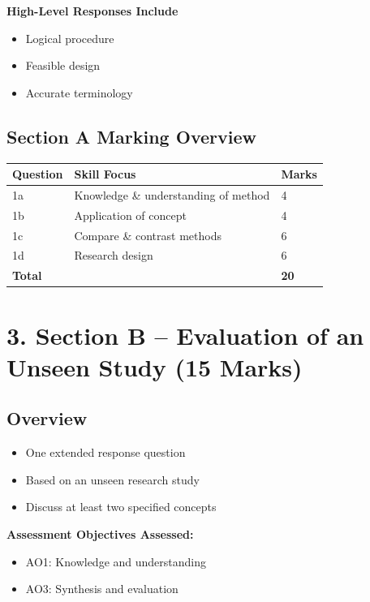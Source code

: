 \documentclass[12pt,a4paper]{article}
\begin{document}
\textbf{High-Level Responses Include}
\begin{itemize}
    \item Logical procedure
    \item Feasible design
    \item Accurate terminology
\end{itemize}

\subsection*{Section A Marking Overview}

\begin{center}
\begin{tabular}{lll}
\toprule
\textbf{Question} & \textbf{Skill Focus} & \textbf{Marks} \\
\midrule
1a & Knowledge \& understanding of method & 4 \\
1b & Application of concept & 4 \\
1c & Compare \& contrast methods & 6 \\
1d & Research design & 6 \\
\midrule
\textbf{Total} & & \textbf{20} \\
\bottomrule
\end{tabular}
\end{center}

\section*{3. Section B – Evaluation of an Unseen Study (15 Marks)}

\subsection*{Overview}

\begin{itemize}
    \item One extended response question
    \item Based on an unseen research study
    \item Discuss at least two specified concepts
\end{itemize}

\textbf{Assessment Objectives Assessed:}
\begin{itemize}
    \item AO1: Knowledge and understanding
    \item AO3: Synthesis and evaluation
\end{itemize}
\end{document}
